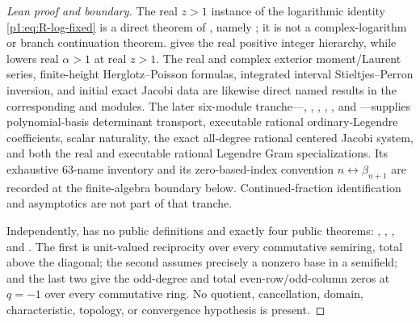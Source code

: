 \documentclass[11pt]{article}
\theoremstyle{definition}
\theoremstyle{remark}
\begin{document}
\begin{proof}[Lean proof and boundary]
The real \(z>1\) instance of the logarithmic identity
\eqref{p1:eq:R-log-fixed} is a direct theorem of
, namely
; it is not a complex-logarithm or branch
continuation theorem.   gives the real positive
integer hierarchy, while  lowers real
\(\alpha>1\) at real \(z>1\).  The real and complex exterior moment/Laurent series,
finite-height Herglotz--Poisson formulas, integrated interval Stieltjes--Perron inversion,
and initial exact Jacobi data are likewise direct named results in the corresponding
 and  modules.
The later six-module tranche---,
, ,
, , and
---supplies polynomial-basis determinant
transport, executable rational ordinary-Legendre coefficients, scalar naturality, the exact
all-degree rational centered Jacobi system, and both the real and executable rational
Legendre Gram specializations.  Its exhaustive 63-name inventory and its zero-based-index
convention \(n\leftrightarrow\beta_{n+1}\) are recorded at the finite-algebra boundary below.
Continued-fraction identification and asymptotics are not part of that tranche.

Independently,  has no public definitions and exactly
four public theorems: ,
,
, and
.  The first is unit-valued reciprocity over
every commutative semiring, total above the diagonal; the second assumes precisely a nonzero
base in a semifield; and the last two give the odd-degree and total even-row/odd-column
zeros at \(q=-1\) over every commutative ring.  No quotient, cancellation, domain,
characteristic, topology, or convergence hypothesis is present.


\end{proof}
\end{document}
